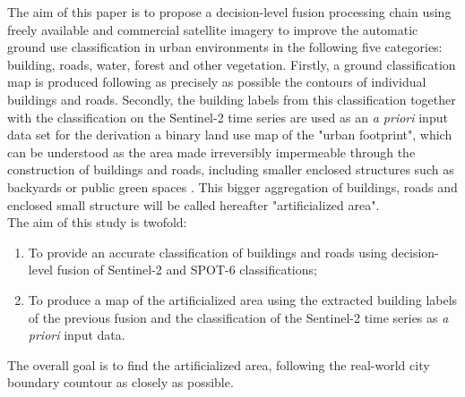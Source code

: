 \documentclass[10pt]{article}
\begin{document}
The aim of this paper is to propose a decision-level fusion processing chain using freely available and commercial satellite imagery to improve the automatic ground use classification in urban environments in the following five categories: building, roads, water, forest and other vegetation. Firstly, a ground classification map is produced following as precisely as possible the contours of individual buildings and roads. Secondly, the building labels from this classification together with the classification on the Sentinel-2 time series are used as an \textit{a priori} input data set for the derivation a binary land use map of the "urban footprint", which can be understood as the area made irreversibly impermeable through the construction of buildings and roads, including smaller enclosed structures such as backyards or public green spaces \parencite{puissant_object-oriented_2014}. This bigger aggregation of buildings, roads and enclosed small structure will be called hereafter "artificialized area".\\

The aim of this study is twofold:
\begin{enumerate}
    \item To provide an accurate classification of buildings and roads using decision-level fusion of Sentinel-2 and SPOT-6 classifications;
    \item To produce a map of the artificialized area using the extracted building labels of the previous fusion and the classification of the Sentinel-2 time series as \textit{a priori} input data. 
\end{enumerate}
The overall goal is to find the artificialized area, following the real-world city boundary countour as closely as possible.
\end{document}
